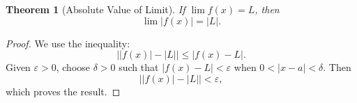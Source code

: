 \documentclass{article}
\newtheorem{theorem}{Theorem}
\begin{document}
\begin{theorem}[Absolute Value of Limit]
If $\lim f(x) = L$, then
\[ \lim |f(x)| = |L|. \]
\end{theorem}

\begin{proof}
We use the inequality:
\[
\left||f(x)| - |L|\right| \leq |f(x) - L|.
\]
Given $\varepsilon > 0$, choose $\delta > 0$ such that $|f(x) - L| < \varepsilon$ when $0 < |x - a| < \delta$. Then
\[
\left||f(x)| - |L|\right| < \varepsilon,
\]
which proves the result.
\end{proof}
\end{document}
